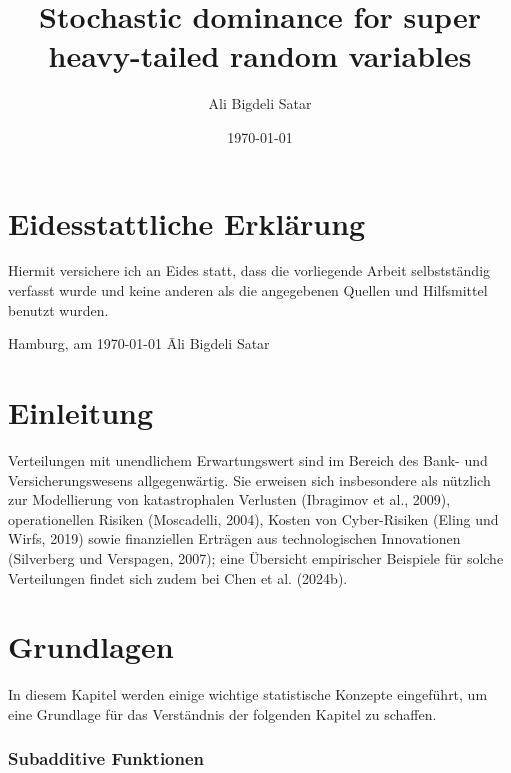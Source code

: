 \documentclass[
12pt,
fancyheadings, %
%
a4paper, 
%
]{tuhhreprt}
\author{Ali Bigdeli Satar}
\title{Stochastic dominance for super heavy-tailed random variables}
\date{\today}
\begin{document}
\frontmatter
\maketitle

\chapter*{Eidesstattliche Erklärung}

Hiermit versichere ich an Eides statt, dass die vorliegende Arbeit selbstständig verfasst wurde und keine anderen als die angegebenen Quellen und Hilfsmittel benutzt wurden.

\vspace{2cm}

\begin{tabbing}
Hamburg, am \today \hspace{5cm} \= Ali Bigdeli Satar
\end{tabbing}

\clearpage

\tableofcontents

\listoffigures{}
\mainmatter
\chapter{Einleitung}

Verteilungen mit unendlichem Erwartungswert sind im Bereich des Bank- und Versicherungswesens allgegenwärtig. Sie erweisen sich insbesondere als nützlich zur Modellierung von katastrophalen Verlusten (Ibragimov et al., 2009), operationellen Risiken (Moscadelli, 2004), Kosten von Cyber-Risiken (Eling und Wirfs, 2019) sowie finanziellen Erträgen aus technologischen Innovationen (Silverberg und Verspagen, 2007); eine Übersicht empirischer Beispiele für solche Verteilungen findet sich zudem bei Chen et al. (2024b).

\chapter{Grundlagen}

\makeatletter
\renewcommand{\thesubsection}{\thechapter.\arabic{subsection}}
\makeatother
In diesem Kapitel werden einige wichtige statistische Konzepte eingeführt, um eine Grundlage für das Verständnis der folgenden Kapitel zu schaffen.

\subsection{Subadditive Funktionen}
\end{document}

